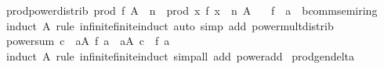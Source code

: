 \begin{isabellebody}
\endisatagproof
{\isafoldproof}%
%
\isadelimproof
\isanewline
%
\endisadelimproof
\isanewline
{}\isamarkupfalse%
\ prod{\isacharunderscore}{\kern0pt}power{\isacharunderscore}{\kern0pt}distrib{\isacharcolon}{\kern0pt}\ {\isachardoublequoteopen}prod\ f\ A\ {\isacharcircum}{\kern0pt}\ n\ {\isacharequal}{\kern0pt}\ prod\ {\isacharparenleft}{\kern0pt}{\isasymlambda}x{\isachardot}{\kern0pt}\ {\isacharparenleft}{\kern0pt}f\ x{\isacharparenright}{\kern0pt}\ {\isacharcircum}{\kern0pt}\ n{\isacharparenright}{\kern0pt}\ A{\isachardoublequoteclose}\isanewline
\ \ \ f\ {\isacharcolon}{\kern0pt}{\isacharcolon}{\kern0pt}\ {\isachardoublequoteopen}{\isacharprime}{\kern0pt}a\ {\isasymRightarrow}\ {\isacharprime}{\kern0pt}b{\isacharcolon}{\kern0pt}{\isacharcolon}{\kern0pt}comm{\isacharunderscore}{\kern0pt}semiring{\isacharunderscore}{\kern0pt}{}{\isachardoublequoteclose}\isanewline
%
\isadelimproof
\ \ %
\endisadelimproof
%
\isatagproof
{}\isamarkupfalse%
\ {\isacharparenleft}{\kern0pt}induct\ A\ rule{\isacharcolon}{\kern0pt}\ infinite{\isacharunderscore}{\kern0pt}finite{\isacharunderscore}{\kern0pt}induct{\isacharparenright}{\kern0pt}\ {\isacharparenleft}{\kern0pt}auto\ simp\ add{\isacharcolon}{\kern0pt}\ power{\isacharunderscore}{\kern0pt}mult{\isacharunderscore}{\kern0pt}distrib{\isacharparenright}{\kern0pt}%
\endisatagproof
{\isafoldproof}%
%
\isadelimproof
\isanewline
%
\endisadelimproof
\isanewline
{}\isamarkupfalse%
\ power{\isacharunderscore}{\kern0pt}sum{\isacharcolon}{\kern0pt}\ {\isachardoublequoteopen}c\ {\isacharcircum}{\kern0pt}\ {\isacharparenleft}{\kern0pt}{\isasymSum}a{\isasymin}A{\isachardot}{\kern0pt}\ f\ a{\isacharparenright}{\kern0pt}\ {\isacharequal}{\kern0pt}\ {\isacharparenleft}{\kern0pt}{\isasymProd}a{\isasymin}A{\isachardot}{\kern0pt}\ c\ {\isacharcircum}{\kern0pt}\ f\ a{\isacharparenright}{\kern0pt}{\isachardoublequoteclose}\isanewline
%
\isadelimproof
\ \ %
\endisadelimproof
%
\isatagproof
{}\isamarkupfalse%
\ {\isacharparenleft}{\kern0pt}induct\ A\ rule{\isacharcolon}{\kern0pt}\ infinite{\isacharunderscore}{\kern0pt}finite{\isacharunderscore}{\kern0pt}induct{\isacharparenright}{\kern0pt}\ {\isacharparenleft}{\kern0pt}simp{\isacharunderscore}{\kern0pt}all\ add{\isacharcolon}{\kern0pt}\ power{\isacharunderscore}{\kern0pt}add{\isacharparenright}{\kern0pt}%
\endisatagproof
{\isafoldproof}%
%
\isadelimproof
\isanewline
%
\endisadelimproof
\isanewline
{}\isamarkupfalse%
\ prod{\isacharunderscore}{\kern0pt}gen{\isacharunderscore}{\kern0pt}delta{\isacharcolon}{\kern0pt}\isanewline

\end{isabellebody}
